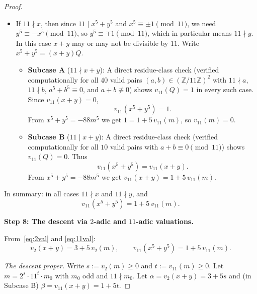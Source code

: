\documentclass[12pt]{article}
\theoremstyle{definition}
\begin{document}
\begin{proof}
\begin{itemize}
    \item If $11 \nmid x$, then since $11 \mid x^5+y^5$ and $x^5 \equiv \pm 1
          \pmod{11}$, we need $y^5 \equiv -x^5 \pmod{11}$, so $y^5 \equiv
          \mp 1 \pmod{11}$, which in particular means $11 \nmid y$. In this case
          $x + y$ may or may not be divisible by $11$. Write $x^5 + y^5 = (x+y)Q$.
          \begin{itemize}
              \item \textbf{Subcase A} ($11 \nmid x + y$): A direct residue-class
                    check (verified computationally for all $40$ valid pairs
                    $(a,b) \in (\mathbb{Z}/11\mathbb{Z})^2$ with $11 \nmid a$,
                    $11 \nmid b$, $a^5 + b^5 \equiv 0$, and $a + b \not\equiv 0$)
                    shows $v_{11}(Q) = 1$ in every such case. Since $v_{11}(x+y) = 0$,
                    \[
                        v_{11}(x^5 + y^5) = 1.
                    \]
                    From $x^5+y^5 = -88m^5$ we get $1 = 1 + 5\,v_{11}(m)$, so
                    $v_{11}(m) = 0$.

              \item \textbf{Subcase B} ($11 \mid x + y$): A direct residue-class
                    check (verified computationally for all $10$ valid pairs with
                    $a + b \equiv 0 \pmod{11}$) shows $v_{11}(Q) = 0$. Thus
                    \[
                        v_{11}(x^5 + y^5) = v_{11}(x + y).
                    \]
                    From $x^5+y^5 = -88m^5$ we get
                    $v_{11}(x+y) = 1 + 5\,v_{11}(m)$.
          \end{itemize}
\end{itemize}

In summary: in all cases $11 \nmid x$ and $11 \nmid y$, and
\begin{equation}\label{eq:11val}
    v_{11}(x^5+y^5) = 1 + 5\,v_{11}(m).
\end{equation}

\medskip

\textbf{Step 8: The descent via $2$-adic and $11$-adic valuations.}

From~\eqref{eq:2val} and \eqref{eq:11val}:
\[
    v_2(x+y) = 3 + 5\,v_2(m), \qquad v_{11}(x^5+y^5) = 1 + 5\,v_{11}(m).
\]

\emph{The descent proper.} Write $s := v_2(m) \geq 0$ and $t := v_{11}(m) \geq 0$.
Let $m = 2^s \cdot 11^t \cdot m_0$ with $m_0$ odd and $11 \nmid m_0$. Let
$\alpha = v_2(x+y) = 3 + 5s$ and (in Subcase B) $\beta = v_{11}(x+y) = 1 + 5t$.


\end{proof}
\end{document}
